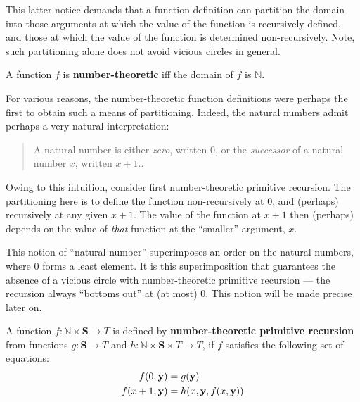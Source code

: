 This latter notice demands that a function definition can partition the domain
into those arguments at which the value of the function is recursively defined,
and those at which the value of the function is determined non-recursively.
Note, such partitioning alone does not avoid vicious circles in general.

\begin{definition} A function $f$ is \textbf{number-theoretic} iff the domain
of $f$ is $\mathbb{N}$. \end{definition}

For various reasons, the number-theoretic function definitions were perhaps the
first to obtain such a means of partitioning. Indeed, the natural numbers admit
perhaps a very natural interpretation:

\begin{quote}

A natural number is either \emph{zero}, written $0$, or the \emph{successor} of
a natural number $x$, written $x+1$.\cite{dedekind-1888, rose-1984,
odifreddi-1989}.

\end{quote}


Owing to this intuition, consider first number-theoretic primitive recursion.
The partitioning here is to define the function non-recursively at $0$, and
(perhaps) recursively at any given $x+1$. The value of the function at $x+1$
then (perhaps) depends on the value of \emph{that} function at the ``smaller''
argument, $x$.

This notion of ``natural number'' superimposes an order on the natural numbers,
where $0$ forms a least element. It is this superimposition that guarantees the
absence of a vicious circle with number-theoretic primitive recursion --- the
recursion always ``bottoms out'' at (at most) $0$. This notion will be made
precise later on.

\begin{definition} A function $f : \mathbb{N} \times \mathbf{S} \rightarrow T$
is defined by \textbf{number-theoretic primitive recursion} from functions $g :
\mathbf{S} \rightarrow T$ and $h : \mathbb{N} \times \mathbf{S} \times T
\rightarrow T$, if $f$ satisfies the following set of equations:\begin{align*}
%
f\p{0, \mathbf{y}} &= g\p{\mathbf{y}}\\
%
f\p{x+1, \mathbf{y}} &= h\p{x,\mathbf{y},f\p{x,\mathbf{y}}}
%
\end{align*}\end{definition}

